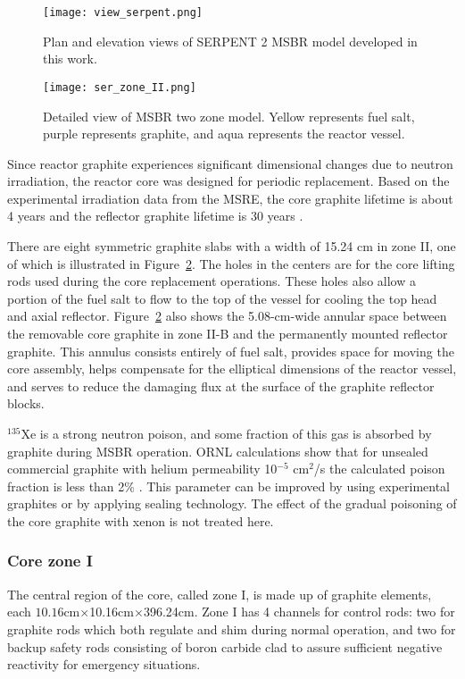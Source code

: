 \begin{figure}[hbp!] %
  \texttt{[image: view\_serpent.png]}
  \caption{Plan and elevation views of SERPENT 2 \gls{MSBR} model developed in 
  this work.}
  \label{fig:serpent_plan_view}
\end{figure}

\begin{figure}[t!] %
  \texttt{[image: ser\_zone\_II.png]}
  \caption{Detailed view of \gls{MSBR} two zone model. 
          Yellow represents fuel salt, purple represents graphite, and aqua represents the reactor vessel.}
  \label{fig:serpent_zoneII}
\end{figure}

Since reactor graphite experiences significant dimensional changes due to 
neutron irradiation, the reactor core was designed for periodic replacement. 
Based on the experimental irradiation data from the \gls{MSRE}, the core graphite 
lifetime is about 4 years and the reflector graphite lifetime is 30 years 
\cite{robertson_conceptual_1971}.

There are eight symmetric graphite slabs with a width of 15.24 cm in zone II, 
one of which is illustrated in Figure~\ref{fig:serpent_zoneII}. The holes in 
the centers are for the core lifting rods used during the core replacement 
operations. These holes also allow a portion of the fuel salt to flow to the 
top of the vessel for cooling the top head and axial reflector. 
Figure~\ref{fig:serpent_zoneII} also shows
the 5.08-cm-wide annular 
space between the removable core graphite in zone II-B and the permanently 
mounted reflector graphite. This annulus consists entirely of fuel salt, 
provides space for moving the core assembly, helps compensate for the elliptical 
dimensions of the reactor vessel, and serves to reduce the damaging flux at the 
surface of the graphite reflector blocks. 

$^{135}$Xe is a strong neutron poison, and some fraction of this gas 
is absorbed by graphite during \gls{MSBR} operation. ORNL calculations show 
that for unsealed commercial graphite with helium permeability 10$^{-5}$ 
cm$^2$/s the calculated poison fraction is less than 2\% 
\cite{robertson_conceptual_1971}.  This parameter can be improved by using 
experimental graphites or by applying sealing technology. The effect of the 
gradual poisoning of the core graphite with xenon is not treated here.

\subsubsection{Core zone I}
The central region of the core, called zone I, is made up of graphite elements, 
each $10.16$cm$\times$10.16cm$\times$396.24cm. Zone I has 4 channels for 
control rods: two for graphite rods which both regulate and shim during normal 
operation, and two for backup safety rods consisting of boron carbide clad to 
assure sufficient negative reactivity for emergency situations.

